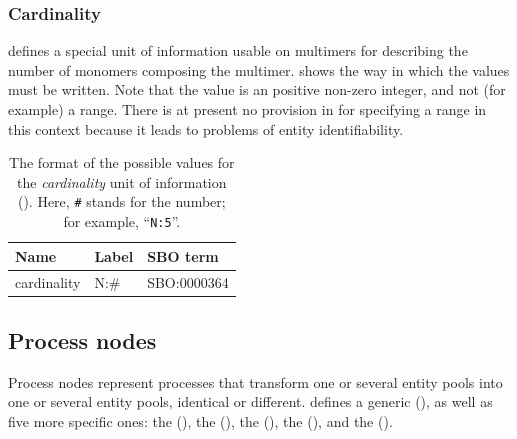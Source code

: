 \subsubsection{Cardinality}
\label{sec:cardinality-cv}

\SBGNPDLone defines a special unit of information usable on multimers for describing the number of monomers composing the multimer.   shows the way in which the values must be written.  Note that the value is an positive non-zero integer, and not (for example) a range.  There is at present no provision in \SBGNPDLone for specifying a range in this context because it leads to problems of entity identifiability.

\begin{table}[htb]
  \centering
  \begin{tabular}{l>{\ttfamily}l>{\ttfamily}l}
    \toprule
    \textbf{Name}   & \textbf{\rmfamily Label} & \textbf{\rmfamily SBO term} \\
    \midrule
    cardinality    & N:\#  & SBO:0000364\\
    \bottomrule
  \end{tabular}
  \caption{The format of the possible values for the
    \emph{cardinality} unit of information
    ().  Here, \texttt{\#} stands for the
    number; for example, ``\texttt{N:5}''.}
  \label{tab:cardinality-cv}
\end{table}



\subsection{Process nodes}\label{sec:PNs}

Process nodes represent processes that transform one or several entity pools into one or several entity pools, identical or different.  \SBGNPDLone defines a generic  (), as well as five more specific ones: the  (), the  (), the  (), the  (), and the  ().

